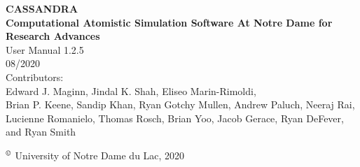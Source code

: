\begin{center}
\vspace*{2 in}
{\huge{\bf CASSANDRA} }\\
\vspace{0.5in}
{\huge { \bf  Computational Atomistic Simulation Software At Notre Dame for Research Advances}} \\
\vspace{1 in}
User Manual 1.2.5 \\
\vspace{.2 in}
08/2020 \\
\vspace{0.2in}
Contributors: \\
\vspace{0.2in}
Edward J. Maginn, Jindal K. Shah, Eliseo Marin-Rimoldi, \\
Brian P. Keene, Sandip Khan, Ryan Gotchy Mullen, Andrew Paluch,
Neeraj Rai, Lucienne Romanielo, Thomas Rosch, Brian Yoo, Jacob Gerace, Ryan DeFever, and Ryan Smith
\end{center}
\vspace{1.0in}
$^\copyright$ University of Notre Dame du Lac, 2020
